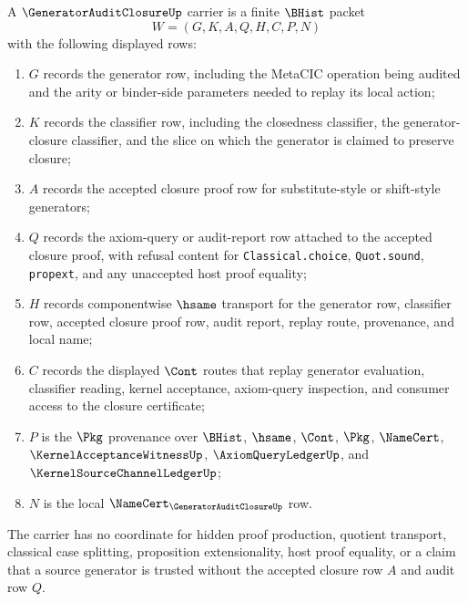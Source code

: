 \begin{definition}
\label{def:generator-audit-closure-carrier}
A $\GeneratorAuditClosureUp$ carrier is a finite $\BHist$ packet
$$
W=(G,K,A,Q,H,C,P,N)
$$
with the following displayed rows:
\begin{enumerate}
\item $G$ records the generator row, including the MetaCIC operation being audited and the arity or binder-side parameters needed to replay its local action;
\item $K$ records the classifier row, including the closedness classifier, the generator-closure classifier, and the slice on which the generator is claimed to preserve closure;
\item $A$ records the accepted closure proof row for substitute-style or shift-style generators;
\item $Q$ records the axiom-query or audit-report row attached to the accepted closure proof, with refusal content for \texttt{Classical.choice}, \texttt{Quot.sound}, \texttt{propext}, and any unaccepted host proof equality;
\item $H$ records componentwise $\hsame$ transport for the generator row, classifier row, accepted closure proof row, audit report, replay route, provenance, and local name;
\item $C$ records the displayed $\Cont$ routes that replay generator evaluation, classifier reading, kernel acceptance, axiom-query inspection, and consumer access to the closure certificate;
\item $P$ is the $\Pkg$ provenance over $\BHist$, $\hsame$, $\Cont$, $\Pkg$, $\NameCert$, $\KernelAcceptanceWitnessUp$, $\AxiomQueryLedgerUp$, and $\KernelSourceChannelLedgerUp$;
\item $N$ is the local $\NameCert_{\GeneratorAuditClosureUp}$ row.
\end{enumerate}
The carrier has no coordinate for hidden proof production, quotient transport, classical case splitting, proposition extensionality, host proof equality, or a claim that a source generator is trusted without the accepted closure row $A$ and audit row $Q$.
\end{definition}

